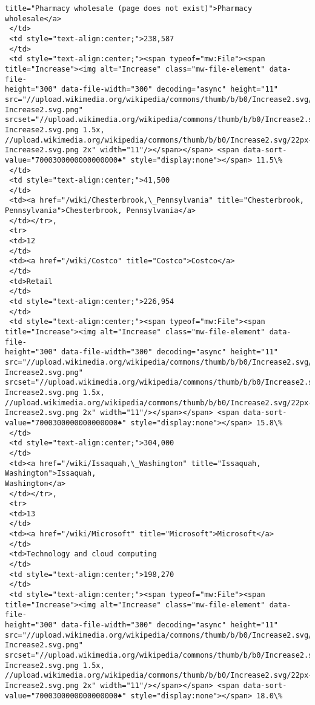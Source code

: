\documentclass[11pt]{article}
\begin{document}
\begin{tcolorbox}[breakable, size=fbox, boxrule=.5pt, pad at break*=1mm, opacityfill=0]
\begin{Verbatim}[commandchars=\\\{\}]
title="Pharmacy wholesale (page does not exist)">Pharmacy wholesale</a>
 </td>
 <td style="text-align:center;">238,587
 </td>
 <td style="text-align:center;"><span typeof="mw:File"><span
title="Increase"><img alt="Increase" class="mw-file-element" data-file-
height="300" data-file-width="300" decoding="async" height="11"
src="//upload.wikimedia.org/wikipedia/commons/thumb/b/b0/Increase2.svg/11px-
Increase2.svg.png"
srcset="//upload.wikimedia.org/wikipedia/commons/thumb/b/b0/Increase2.svg/17px-
Increase2.svg.png 1.5x,
//upload.wikimedia.org/wikipedia/commons/thumb/b/b0/Increase2.svg/22px-
Increase2.svg.png 2x" width="11"/></span></span> <span data-sort-
value="7000300000000000000♠" style="display:none"></span> 11.5\%
 </td>
 <td style="text-align:center;">41,500
 </td>
 <td><a href="/wiki/Chesterbrook,\_Pennsylvania" title="Chesterbrook,
Pennsylvania">Chesterbrook, Pennsylvania</a>
 </td></tr>,
 <tr>
 <td>12
 </td>
 <td><a href="/wiki/Costco" title="Costco">Costco</a>
 </td>
 <td>Retail
 </td>
 <td style="text-align:center;">226,954
 </td>
 <td style="text-align:center;"><span typeof="mw:File"><span
title="Increase"><img alt="Increase" class="mw-file-element" data-file-
height="300" data-file-width="300" decoding="async" height="11"
src="//upload.wikimedia.org/wikipedia/commons/thumb/b/b0/Increase2.svg/11px-
Increase2.svg.png"
srcset="//upload.wikimedia.org/wikipedia/commons/thumb/b/b0/Increase2.svg/17px-
Increase2.svg.png 1.5x,
//upload.wikimedia.org/wikipedia/commons/thumb/b/b0/Increase2.svg/22px-
Increase2.svg.png 2x" width="11"/></span></span> <span data-sort-
value="7000300000000000000♠" style="display:none"></span> 15.8\%
 </td>
 <td style="text-align:center;">304,000
 </td>
 <td><a href="/wiki/Issaquah,\_Washington" title="Issaquah, Washington">Issaquah,
Washington</a>
 </td></tr>,
 <tr>
 <td>13
 </td>
 <td><a href="/wiki/Microsoft" title="Microsoft">Microsoft</a>
 </td>
 <td>Technology and cloud computing
 </td>
 <td style="text-align:center;">198,270
 </td>
 <td style="text-align:center;"><span typeof="mw:File"><span
title="Increase"><img alt="Increase" class="mw-file-element" data-file-
height="300" data-file-width="300" decoding="async" height="11"
src="//upload.wikimedia.org/wikipedia/commons/thumb/b/b0/Increase2.svg/11px-
Increase2.svg.png"
srcset="//upload.wikimedia.org/wikipedia/commons/thumb/b/b0/Increase2.svg/17px-
Increase2.svg.png 1.5x,
//upload.wikimedia.org/wikipedia/commons/thumb/b/b0/Increase2.svg/22px-
Increase2.svg.png 2x" width="11"/></span></span> <span data-sort-
value="7000300000000000000♠" style="display:none"></span> 18.0\%

\end{Verbatim}
\end{tcolorbox}
\end{document}
